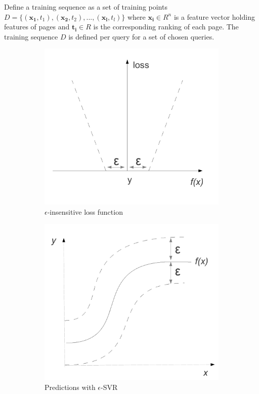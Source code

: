 \documentclass[12pt,a4paper,notitlepage,twoside]{scrbook}
\begin{document}
Define a training sequence as a set of training points \(D = \{ (\mathbf{x_1},t_1),
(\mathbf{x_2},t_2), ... , (\mathbf{x_l},t_l) \}\) where \( \mathbf{x_i} \in R^n \) is a
feature vector holding features of pages and \( \mathbf{t_i} \in R \) is the corresponding
ranking of each page. The training sequence \(D\) is defined per query for a set of chosen
queries.

\begin{figure}[h!]
  \centering 
  \begin{subfigure}[b]{0.49\textwidth}
  \includegraphics[width=\linewidth]{figs/loss.pdf}
  \caption{\(\epsilon\)-insensitive loss function}
  \label{eps1} 
\end{subfigure}
  \begin{subfigure}[b]{0.49\textwidth}
  \centering 
  \includegraphics[width=\linewidth]{figs/loss2.pdf}
  \caption{Predictions with \(\epsilon\)-SVR}
  \label{eps2} 
\end{subfigure}
\caption{\label{eps}}
\end{figure}
\end{document}
